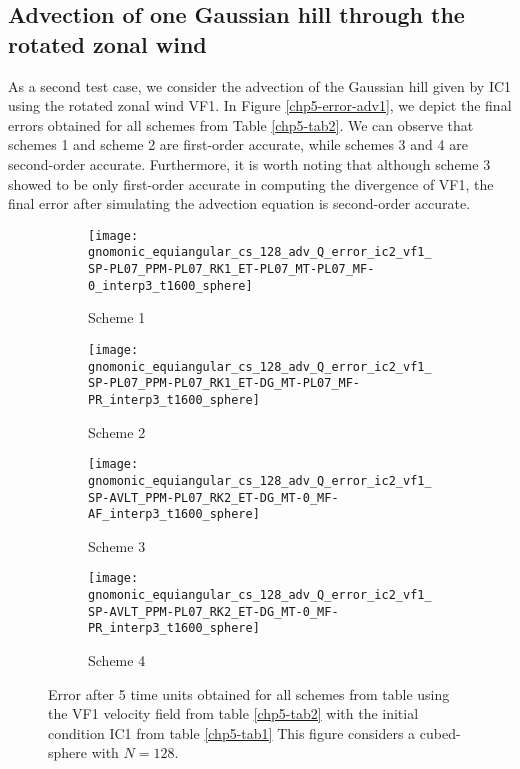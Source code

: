 \subsection{Advection of one Gaussian hill through the rotated zonal wind}
As a second test case, we consider the advection of the Gaussian hill given by IC1 using 
the rotated zonal wind VF1.
In Figure \ref{chp5-error-adv1}, we depict the final errors obtained for 
all schemes from Table \ref{chp5-tab2}.
We can observe that schemes 1 and scheme 2 are first-order accurate, while schemes 3 and 4 
are second-order accurate.
Furthermore, it is worth noting that although scheme 3 showed to be only first-order 
accurate in computing the divergence of VF1, the final error after simulating the advection 
equation is second-order accurate.
\begin{figure}[!htb]
	\centering
	\begin{subfigure}{0.4\textwidth}
		\centering
		\texttt{[image: gnomonic\_equiangular\_cs\_128\_adv\_Q\_error\_ic2\_vf1\_SP-PL07\_PPM-PL07\_RK1\_ET-PL07\_MT-PL07\_MF-0\_interp3\_t1600\_sphere]}
		\caption{Scheme 1 \label{chp5-adv1-s1}}
	\end{subfigure}
	\begin{subfigure}{0.4\textwidth}
		\centering
		\texttt{[image: gnomonic\_equiangular\_cs\_128\_adv\_Q\_error\_ic2\_vf1\_SP-PL07\_PPM-PL07\_RK1\_ET-DG\_MT-PL07\_MF-PR\_interp3\_t1600\_sphere]}
		\caption{Scheme 2 \label{chp5-adv1-s2}}
	\end{subfigure}
	
	\begin{subfigure}{0.4\textwidth}
		\centering
		\texttt{[image: gnomonic\_equiangular\_cs\_128\_adv\_Q\_error\_ic2\_vf1\_SP-AVLT\_PPM-PL07\_RK2\_ET-DG\_MT-0\_MF-AF\_interp3\_t1600\_sphere]}
		\caption{Scheme 3 \label{chp5-adv1-s3}}
	\end{subfigure}
	\begin{subfigure}{0.4\textwidth}
		\centering
		\texttt{[image: gnomonic\_equiangular\_cs\_128\_adv\_Q\_error\_ic2\_vf1\_SP-AVLT\_PPM-PL07\_RK2\_ET-DG\_MT-0\_MF-PR\_interp3\_t1600\_sphere]}
		\caption{Scheme 4 \label{chp5-adv1-s4}}
	\end{subfigure}
	\caption{ Error after 5 time units obtained for all schemes from table using the VF1 velocity field from table \ref{chp5-tab2} with the initial condition IC1 from  table \ref{chp5-tab1} 
		This figure considers a cubed-sphere with $N=128$. \label{chp5-adv1}}
\end{figure}

